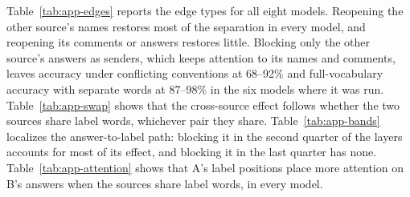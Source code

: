 Table~\ref{tab:app-edges} reports the edge types for all eight models.
Reopening the other source's names restores most of the separation in every model, and reopening its comments or answers restores little.
Blocking only the other source's answers as senders, which keeps attention to its names and comments, leaves accuracy under conflicting conventions at 68--92\% and full-vocabulary accuracy with separate words at 87--98\% in the six models where it was run.
Table~\ref{tab:app-swap} shows that the cross-source effect follows whether the two sources share label words, whichever pair they share.
Table~\ref{tab:app-bands} localizes the answer-to-label path: blocking it in the second quarter of the layers accounts for most of its effect, and blocking it in the last quarter has none.
Table~\ref{tab:app-attention} shows that A's label positions place more attention on B's answers when the sources share label words, in every model.

\begin{table}[t]
\centering\small
{}
\caption{Accuracy when complete isolation is relaxed for one type of the other source's tokens (SST-5, query reads both sources).}
\label{tab:app-edges}
\end{table}

\begin{table}[t]
\centering\small
{}
\caption{The cross-source effect depends on whether the sources share label words, not on which words they share.}
\label{tab:app-swap}
\end{table}

